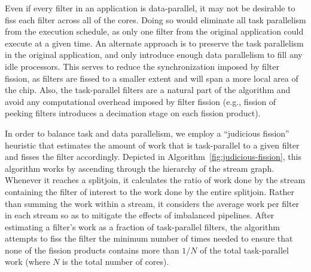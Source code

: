 
Even if every filter in an application is data-parallel, it may not be
desirable to fiss each filter across all of the cores.  Doing so would
eliminate all task parallelism from the execution schedule, as only
one filter from the original application could execute at a given
time.  An alternate approach is to preserve the task parallelism in
the original application, and only introduce enough data parallelism
to fill any idle processors.  This serves to reduce the
synchronization imposed by filter fission, as filters are fissed to a
smaller extent and will span a more local area of the chip.  Also, the
task-parallel filters are a natural part of the algorithm and avoid
any computational overhead imposed by filter fission (e.g., fission of
peeking filters introduces a decimation stage on each fission
product).

In order to balance task and data parallelism, we employ a ``judicious
fission'' heuristic that estimates the amount of work that is
task-parallel to a given filter and fisses the filter accordingly.
Depicted in Algorithm~\ref{fig:judicious-fission}, this algorithm
works by ascending through the hierarchy of the stream graph.
Whenever it reaches a splitjoin, it calculates the ratio of work done
by the stream containing the filter of interest to the work done by
the entire splitjoin.  Rather than summing the work within a stream,
it considers the average work per filter in each stream so as to
mitigate the effects of imbalanced pipelines.
After estimating a filter's work as a fraction of task-parallel
filters, the algorithm attempts to fiss the filter the minimum number
of times needed to ensure that none of the fission products contains
more than $1/N$ of the total task-parallel work (where $N$ is the
total number of cores).

